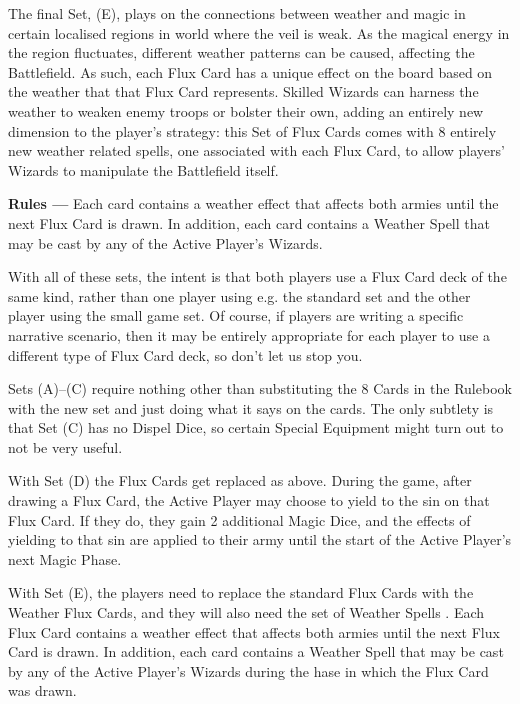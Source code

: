 The final Set, (E), plays on the connections between weather and magic in certain localised regions in \theninthage{} world where the veil is weak. As the magical energy in the region fluctuates, different weather patterns can be caused, affecting the Battlefield. As such, each Flux Card has a unique effect on the board based on the weather that that Flux Card represents. Skilled Wizards can harness the weather to weaken enemy troops or bolster their own, adding an entirely new dimension to the player's strategy: this Set of Flux Cards comes with 8 entirely new weather related spells, one associated with each Flux Card, to allow players' Wizards to manipulate the Battlefield itself.

\textbf{Rules ---} Each card contains a weather effect that affects both armies until the next Flux Card is drawn. In
addition, each card contains a Weather Spell that may be cast by any of the Active Player's Wizards.


With all of these sets, the intent is that both players use a Flux Card deck of the same kind, rather than one player using e.g. the standard set and the other player using the small game set. Of course, if players are writing a specific narrative scenario, then it may be entirely appropriate for each player to use a different type of Flux Card deck, so don't let us stop you.

Sets (A)--(C) require nothing other than substituting the 8  Cards in the Rulebook with the new set and
just doing what it says on the cards. The only subtlety is that Set (C) has no Dispel Dice, so certain Special Equipment might turn out to not be very useful.

With Set (D) the Flux Cards get replaced as above. During the game, after drawing a Flux Card, the Active Player may choose to yield to the sin on that Flux Card. If they do, they gain 2 additional Magic Dice, and the effects of yielding to that sin are applied to their army until the start of the Active Player's next Magic Phase.

With Set (E), the players need to replace the standard Flux Cards with the Weather Flux Cards, and they will also need the set of Weather Spells . Each Flux Card contains a weather effect that affects both armies until the next Flux Card is drawn. In addition, each card contains a Weather Spell that may be cast by any of the Active Player's Wizards during the hase in which the Flux Card was drawn.
